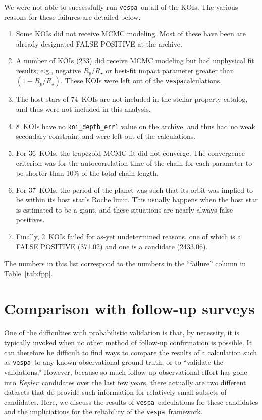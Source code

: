 \documentclass{emulateapj}
\newcommand{\Tab}[1]{Table~\ref{tab:#1}}
\newcommand{\tab}[1]{\Tab{#1}}
\newcommand{\sectlabel}[1]{\label{sect:#1}}
\newcommand{\nbadrowemcmc}{233}
\newcommand{\nbadstellar}{74} %
\newcommand{\nbadsec}{8} %
\newcommand{\nbadtrapfit}{36}
\newcommand{\nbadroche}{37}
\newcommand{\nbadother}{2}
\newcommand{\kepler}{\textit{Kepler}}
\newcommand{\vespa}{\texttt{vespa}}
\begin{document}
We were not able to successfully run \vespa\ on all of the KOIs. The 
various reasons for these failures are detailed below.  
\begin{enumerate}
\item Some KOIs did not receive MCMC modeling.  Most of these
  have been are already designated FALSE POSITIVE at the archive.
\item A number of KOIs (\nbadrowemcmc) did receive MCMC modeling but had unphysical fit
  results; e.g., negative $R_p/R_\star$ or best-fit impact parameter
  greater than $(1 + R_p/R_\star)$.  These KOIs were left out of the \vespa calculations.
\item The host stars of \nbadstellar\ KOIs are not included in the
   stellar property catalog, and thus were not
  included in this analysis.
\item \nbadsec\ KOIs have no \verb|koi_depth_err1| value on the archive,
  and thus had no weak secondary constraint and were left out of the
  calculations.
\item For \nbadtrapfit\ KOIs, the trapezoid MCMC fit did not converge.  The
  convergence criterion was for the autocorrelation time of the chain
  for each parameter to be shorter than 10\% of the total chain
  length.
\item For \nbadroche\ KOIs, the period of the planet was such that its
  orbit was implied to be within its host star's Roche limit.  This
  usually happens when the host star is estimated to be a giant, and
  these situations are nearly always false positives. 
\item Finally, \nbadother\ KOIs failed for as-yet undetermined
  reasons, one of which is a FALSE POSITIVE (371.02) and one is a 
  candidate (2433.06).
\end{enumerate}
The numbers in this list correspond to the numbers in
the ``failure'' column in \tab{fpp}.  

\section{Comparison with follow-up surveys}
\sectlabel{comparisons} 

One of the difficulties with probabilistic
validation is that, by necessity, it is typically invoked when no
other method of follow-up confirmation is possible.  It can therefore
be difficult to find ways to compare the results of a calculation such
as \vespa\ to any known observational ground-truth, or to ``validate
the validations.''  However, because so much follow-up observational
effort has gone into \kepler\ candidates over the last few years,
there actually are two different datasets that do provide such
information for relatively small subsets of candidates.  Here, we
discuss the results of \vespa\ calculations for these candidates and
the impliciations for the reliability of the \vespa\ framework.
\end{document}
